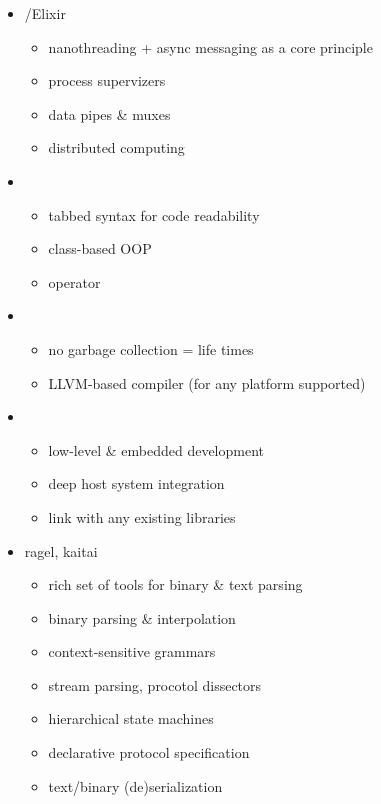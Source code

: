\clearpage{}

\begin{itemize}[nosep]
    \item \erl/Elixir
    \begin{itemize}[nosep]
        \item nanothreading + async messaging as a core principle
        \item process supervizers
        \item data pipes \& muxes
        \item distributed computing
    \end{itemize}
    \item \py
    \begin{itemize}[nosep]
        \item tabbed syntax for code readability
        \item class-based OOP
        \item operator 
    \end{itemize}
    \item \rs
    \begin{itemize}[nosep]
        \item no garbage collection = life times
        \item LLVM-based compiler (for any platform supported)
    \end{itemize}
    \item \Cpp
    \begin{itemize}[nosep]
        \item low-level \& embedded development
        \item deep host system integration
        \item link with any existing libraries
    \end{itemize}
    \item ragel, kaitai
    \begin{itemize}[nosep]
        \item rich set of tools for binary \& text parsing
        \item binary parsing \& interpolation
        \item context-sensitive grammars
        \item stream parsing, procotol dissectors
        \item hierarchical state machines
        \item declarative protocol specification
        \item text/binary (de)serialization

\end{itemize}
\end{itemize}
